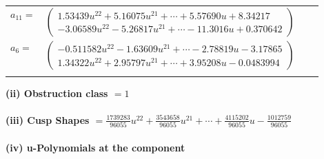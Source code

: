 \documentclass[1p]{elsarticle_modified}
\theoremstyle{definition}
\begin{document}
\begin{tabular}{m{7pt} m{180pt} m{7pt} m{180pt} }
\flushright $a_{11}=$&$\begin{pmatrix}1.53439 u^{22}+5.16075 u^{21}+\cdots+5.57690 u+8.34217\\-3.06589 u^{22}-5.26817 u^{21}+\cdots-11.3016 u+0.370642\end{pmatrix}$ \\
\flushright $a_{6}=$&$\begin{pmatrix}-0.511582 u^{22}-1.63609 u^{21}+\cdots-2.78819 u-3.17865\\1.34322 u^{22}+2.95797 u^{21}+\cdots+3.95208 u-0.0483994\end{pmatrix}$\\&\end{tabular}
\flushleft \textbf{(ii) Obstruction class $= 1$}\\~\\
\flushleft \textbf{(iii) Cusp Shapes $= \frac{1739283}{96055} u^{22}+\frac{3543658}{96055} u^{21}+\cdots+\frac{4115202}{96055} u-\frac{1012759}{96055}$}\\~\\
\newpage\renewcommand{\arraystretch}{1}
\flushleft \textbf{(iv) u-Polynomials at the component}\newline \\
\end{document}
